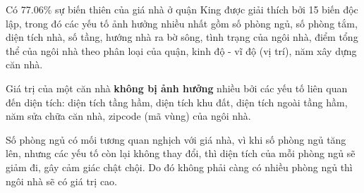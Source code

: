 Có 77.06\% sự biến thiên của giá nhà ở quận King được giải thích bởi 15 biến độc lập, trong đó các yếu tố ảnh hưởng nhiều nhất gồm số phòng ngủ, số phòng tắm, diện tích nhà, số tầng, hướng nhà ra bờ sông, tình trạng của ngôi nhà, điểm tổng thể của ngôi nhà theo phân loại của quận, kinh độ - vĩ độ (vị trí), năm xây dựng căn nhà.

Giá trị của một căn nhà \textbf{không bị ảnh hưởng} nhiều bởi các yếu tố liên quan đến diện tích: diện tích tầng hầm, diện tích khu đất, diện tích ngoài tầng hầm, năm sửa chữa căn nhà, zipcode (mã vùng) của ngôi nhà. 

Số phòng ngủ có mối tương quan nghịch với giá nhà, vì khi số phòng ngủ tăng lên, nhưng các yếu tố còn lại không thay đổi, thì diện tích của mỗi phòng ngủ sẽ giảm đi, gây cảm giác chật chội. Do đó không phải càng có nhiều phòng ngủ thì ngôi nhà sẽ có giá trị cao. 

